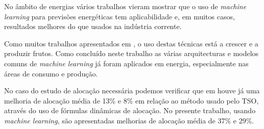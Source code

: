 No âmbito de energias vários trabalhos vieram mostrar que o uso de \textit{machine learning} para previsões energéticas tem aplicabilidade \cite{Stassen} e, em muitos casos, resultados melhores do que usados na indústria corrente. \cite{Ahmad2020} \cite{Antonopoulos2020} \par
Como muitos trabalhos apresentados em \cite{Benti2023}, o uso destas técnicas está a crescer e a produzir frutos. Como concluído neste trabalho as várias arquitecturas e modelos comuns de \textit{machine learning} já foram aplicados em energia, especialmente nas áreas de consumo e produção.\par
No caso do estudo de alocação necessária podemos verificar que em \cite{Algarvio2024} houve já uma melhoria de alocação média de 13\% e 8\% em relação ao método usado pelo \gls{TSO}, através do uso de fórmulas dinâmicas de alocação. No presente trabalho, usando \textit{machine learning}, são apresentadas melhorias de alocação média de 37\% e 29\%.\par






